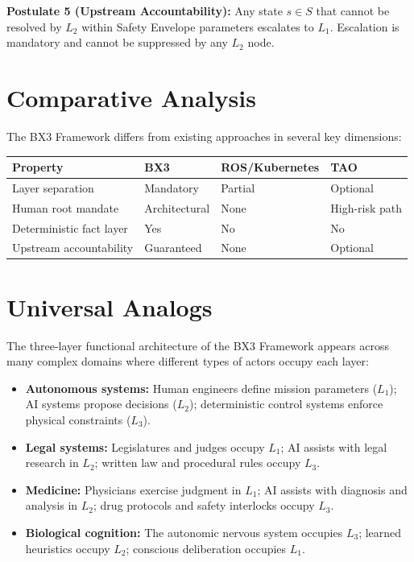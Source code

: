 \documentclass[12pt]{article}
\begin{document}
\textbf{Postulate 5 (Upstream Accountability):} Any state $s \in S$ that cannot be resolved by $L_2$ within Safety Envelope parameters escalates to $L_1$. Escalation is mandatory and cannot be suppressed by any $L_2$ node.

\section{Comparative Analysis}
\label{sec:comparison}

The BX3 Framework differs from existing approaches in several key dimensions:

\begin{center}
\begin{tabular}{p{3.2cm}p{2.5cm}p{2.5cm}p{2.5cm}}
\toprule
\textbf{Property} & \textbf{BX3} & \textbf{ROS/Kubernetes} & \textbf{TAO} \\
\midrule
Layer separation & Mandatory & Partial & Optional \\
Human root mandate & Architectural & None & High-risk path \\
Deterministic fact layer & Yes & No & No \\
Upstream accountability & Guaranteed & None & Optional \\
\bottomrule
\end{tabular}
\end{center}

\section{Universal Analogs}
\label{sec:analogs}

The three-layer functional architecture of the BX3 Framework appears across many complex domains where different types of actors occupy each layer:

\begin{itemize}
    \item \textbf{Autonomous systems:} Human engineers define mission parameters ($L_1$); AI systems propose decisions ($L_2$); deterministic control systems enforce physical constraints ($L_3$).
    \item \textbf{Legal systems:} Legislatures and judges occupy $L_1$; AI assists with legal research in $L_2$; written law and procedural rules occupy $L_3$.
    \item \textbf{Medicine:} Physicians exercise judgment in $L_1$; AI assists with diagnosis and analysis in $L_2$; drug protocols and safety interlocks occupy $L_3$.
    \item \textbf{Biological cognition:} The autonomic nervous system occupies $L_3$; learned heuristics occupy $L_2$; conscious deliberation occupies $L_1$.
\end{itemize}
\end{document}
